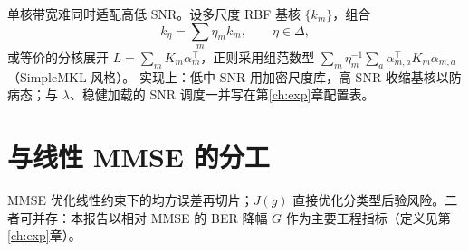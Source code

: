 单核带宽难同时适配高低 SNR。设多尺度 RBF 基核 $\{k_m\}$，组合
\begin{equation}
k_\eta=\sum_m\eta_m k_m,\qquad \eta\in\Delta,
\end{equation}
或等价的分核展开 $L=\sum_m K_m\alpha_m^\top$，正则采用组范数型
$\sum_m\eta_m^{-1}\sum_a\alpha_{m,a}^\top K_m\alpha_{m,a}$（SimpleMKL 风格）。
实现上：低中 SNR 用加密尺度库，高 SNR 收缩基核以防病态；与 $\lambda$、稳健加载的 SNR 调度一并写在第\ref{ch:exp}章配置表。

\section{与线性 MMSE 的分工}

MMSE 优化线性约束下的均方误差再切片；$J(g)$ 直接优化分类型后验风险。二者可并存：本报告以相对 MMSE 的 BER 降幅 $G$ 作为主要工程指标（定义见第\ref{ch:exp}章）。
